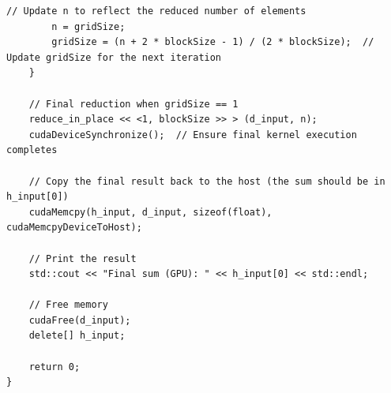 \begin{lstlisting}[caption={优化后的向量归约内核（增加每线程工作量）}]
        // Update n to reflect the reduced number of elements
        n = gridSize;
        gridSize = (n + 2 * blockSize - 1) / (2 * blockSize);  // Update gridSize for the next iteration
    }

    // Final reduction when gridSize == 1
    reduce_in_place << <1, blockSize >> > (d_input, n);
    cudaDeviceSynchronize();  // Ensure final kernel execution completes

    // Copy the final result back to the host (the sum should be in h_input[0])
    cudaMemcpy(h_input, d_input, sizeof(float), cudaMemcpyDeviceToHost);

    // Print the result
    std::cout << "Final sum (GPU): " << h_input[0] << std::endl;

    // Free memory
    cudaFree(d_input);
    delete[] h_input;

    return 0;
}


\end{lstlisting}

